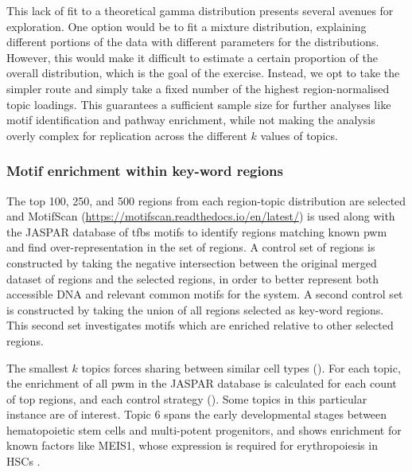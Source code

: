 This lack of fit to a theoretical gamma distribution presents several avenues for exploration. One option would be to fit a mixture distribution, explaining different portions of the data with different parameters for the distributions. However, this would make it difficult to estimate a certain proportion of the overall distribution, which is the goal of the exercise. Instead, we opt to take the simpler route and simply take a fixed number of the highest region-normalised topic loadings. This guarantees a sufficient sample size for further analyses like motif identification and pathway enrichment, while not making the analysis overly complex for replication across the different $k$ values of topics.

\subsubsection{Motif enrichment within key-word regions}

The top 100, 250, and 500 regions from each region-topic distribution are selected and MotifScan (\url{https://motifscan.readthedocs.io/en/latest/}) is used along with the JASPAR database of \gls{tfbs} motifs to identify regions matching known \gls{pwm} and find over-representation in the set of regions. A control set of regions is constructed by taking the negative intersection between the original merged dataset of regions and the selected regions, in order to better represent both accessible DNA and relevant common motifs for the system. A second control set is constructed by taking the union of all regions selected as key-word regions. This second set investigates motifs which are enriched relative to other selected regions.

The smallest $k$ topics forces sharing between similar cell types (). For each topic, the enrichment of all \gls{pwm} in the JASPAR database is calculated for each count of top regions, and each control strategy (). Some topics in this particular instance are of interest. Topic 6 spans the early developmental stages between hematopoietic stem cells and multi-potent progenitors, and shows enrichment for known factors like MEIS1, whose expression is required for erythropoiesis in HSCs \cite{Miller2016,Zeddies2014,Unnisa2012}.  

